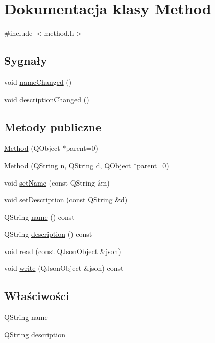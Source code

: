\hypertarget{class_method}{\section{Dokumentacja klasy Method}
\label{class_method}
}


{\ttfamily \#include $<$method.\-h$>$}

\subsection*{Sygnały}
\begin{DoxyCompactItemize}
\item 
void \hyperlink{class_method_a91df3e429b16192100609942fed0c4e7}{name\-Changed} ()
\item 
void \hyperlink{class_method_a555273e8a9c3dbf7c5266d1d34224a87}{description\-Changed} ()
\end{DoxyCompactItemize}
\subsection*{Metody publiczne}
\begin{DoxyCompactItemize}
\item 
\hyperlink{class_method_aa3a7f4470828bcc05b78467d0e840a04}{Method} (Q\-Object $\ast$parent=0)
\item 
\hyperlink{class_method_a44942be54e782afc4a11e444c6a1735c}{Method} (Q\-String n, Q\-String d, Q\-Object $\ast$parent=0)
\item 
void \hyperlink{class_method_a4e8375fe026ed07964e8ff0671ed2446}{set\-Name} (const Q\-String \&n)
\item 
void \hyperlink{class_method_a5e911cf889152d5f6ed5ff24c9091364}{set\-Description} (const Q\-String \&d)
\item 
Q\-String \hyperlink{class_method_a4f22c1375bd806b6a5c55570143251b8}{name} () const 
\item 
Q\-String \hyperlink{class_method_a2d9d9d004a0fc9d152066ac2728f354c}{description} () const 
\item 
void \hyperlink{class_method_a7fb905d9402518987d08e2d6e5227d88}{read} (const Q\-Json\-Object \&json)
\item 
void \hyperlink{class_method_a706689fe25b5ed85f9b1480d78574bb7}{write} (Q\-Json\-Object \&json) const 
\end{DoxyCompactItemize}
\subsection*{Właściwości}
\begin{DoxyCompactItemize}
\item 
Q\-String \hyperlink{class_method_a9131d3ff2cd50747c50290986126aff3}{name}
\item 
Q\-String \hyperlink{class_method_ab9629abfec31f98ae690c575d48ccfe7}{description}
\end{DoxyCompactItemize}
